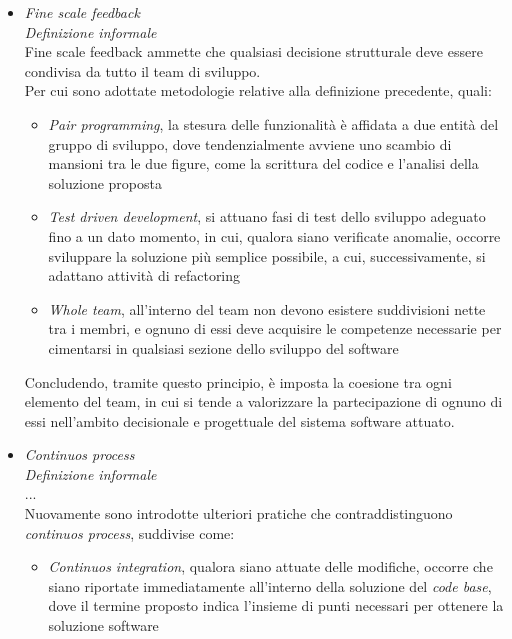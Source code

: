 \documentclass{article}
\begin{document}
\begin{itemize}[label={-}]
    \item \textit{Fine scale feedback}\vspace*{7pt}\\
    \textit{Definizione informale}\\
    Fine scale feedback ammette che qualsiasi decisione strutturale deve essere condivisa da tutto il team di sviluppo.\vspace*{7pt}\\
    Per cui sono adottate metodologie relative alla definizione precedente, quali:
    \begin{itemize}
        \item \textit{Pair programming}, la stesura delle funzionalità è affidata a due entità del gruppo di sviluppo, dove tendenzialmente avviene uno scambio di mansioni tra le due figure, come la scrittura del codice e l'analisi della soluzione proposta
        \item \textit{Test driven development}, si attuano fasi di test dello sviluppo adeguato fino a un dato momento, in cui, qualora siano verificate anomalie, occorre sviluppare la soluzione più semplice possibile, a cui, successivamente, si adattano attività di refactoring
        \item \textit{Whole team}, all'interno del team non devono esistere suddivisioni nette tra i membri, e ognuno di essi deve acquisire le competenze necessarie per cimentarsi in qualsiasi sezione dello sviluppo del software
    \end{itemize}
    Concludendo, tramite questo principio, è imposta la coesione tra ogni elemento del team, in cui si tende a valorizzare la partecipazione di ognuno di essi nell'ambito decisionale e progettuale del sistema software attuato.
    \item \textit{Continuos process}\vspace*{7pt}\\
    \textit{Definizione informale}\\
    ...\vspace*{7pt}\\
    Nuovamente sono introdotte ulteriori pratiche che contraddistinguono \textit{continuos process}, suddivise come:
    \begin{itemize}
        \item \textit{Continuos integration}, qualora siano attuate delle modifiche, occorre che siano riportate immediatamente all'interno della soluzione del \textit{code base}, dove il termine proposto indica l'insieme di punti necessari per ottenere la soluzione software

\end{itemize}
\end{itemize}
\end{document}
